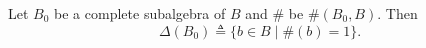 Let $B_0$ be a complete subalgebra of $B$ and $\#$ be $\#(B_0, B)$. Then
$$\Delta(B_0) \triangleq \{b \in B \mid \#(b) = 1\}.$$
